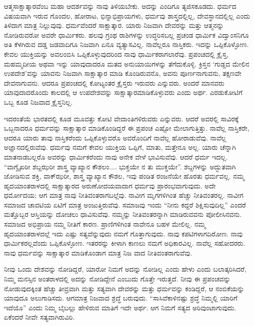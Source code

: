 \vskip 0.2cm 

ಆತ್ಮಸಾಕ್ಷಾತ್ಕಾರವೆಂಬ ಮಹಾ ಆದರ್ಶವನ್ನು ನಾವು ತಿಳಿಯಬೇಕು. ಅದನ್ನು ಎಂದಿಗೂ ತ್ಯಜಿಸಕೂಡದು. ಧರ್ಮದ ವಿಷಯವಾಗಿ ಇರುವ ಗೊಂದಲ, ಹೋರಾಟ, ಭಿನ್ನಾಭಿಪ್ರಾಯಗಳು, ಧರ್ಮವು ಶಾಸ್ತ್ರದಲ್ಲಿಲ್ಲ, ದೇವಸ್ಥಾನದಲ್ಲಿಲ್ಲ ಎಂದು ತಿಳಿದಾಗ ಮಾತ್ರ ನಿಲ್ಲುವುವು. ಧರ್ಮವೆಂದರೆ ಸಾಕ್ಷಾತ್ಕಾರ. ಯಾರು ನಿಜವಾಗಿ ದೇವರನ್ನು ಮತ್ತು ಆತ್ಮನನ್ನು ನೋಡಿರುವರೋ ಅವರೇ ಧಾರ್ಮಿಕರು. ಹಲವು ಗ್ರಂಥ ರಾಶಿಗಳನ್ನು ಉದ್ಧರಿಸಬಲ್ಲ ಪ್ರಚಂಡ ಧಾರ್ಮಿಕ ವಿದ್ವಾಂಸನಿಗೂ ಅತಿ ಕೆಳಗಿರುವ ದಡ್ಡ ಜಡವಾದಿಗೂ ನಿಜವಾಗಿ ಏನೂ ವ್ಯತ್ಯಾಸವಿಲ್ಲ. ನಾವೆಲ್ಲರೂ ನಾಸ್ತಿಕರು. ಇದನ್ನು ಒಪ್ಪಿಕೊಳ್ಳೋಣ. ಕೇವಲ ಯುಕ್ತಿಯನ್ನು ಅವಲಂಬಿಸಿ ಒಪ್ಪಿಕೊಳ್ಳುವುದರಿಂದ ನಾವು ಧಾರ್ಮಿಕರಾಗಲಾರೆವು. ಪ್ರಪಂಚದಲ್ಲಿ ಕ್ರೈಸ್ತ, ಮಹಮ್ಮದೀಯ ಅಥವಾ ಇನ್ನು ಯಾವುದಾದರೂ ಮತದ ಅನುಯಾಯಿಗಳನ್ನು ತೆಗೆದುಕೊಳ್ಳಿ. ಕ್ರಿಸ್ತನ ‘ಗುಡ್ಡದ ಮೇಲಿನ ಉಪದೇಶ’ವನ್ನು ಯಾವನು ನಿಜವಾಗಿ ಸಾಕ್ಷಾತ್ಕಾರ ಮಾಡಿ ಕೊಂಡಿರುವನೊ, ಅವನು ಪೂರ್ಣನಾಗುವನು, ತಕ್ಷಣವೇ ದೇವನಾಗುವನು. ಆದರೂ ಪ್ರಪಂಚದಲ್ಲಿ ಕೋಟ್ಯಂತರ ಕ್ರೈಸ್ತರು ಇರುವರು ಎನ್ನುವರು. ಅಂದರೆ ಮಾನವರು ಯಾವುದಾದರೊಂದು ಕಾಲದಲ್ಲಿ ಆ ಉಪದೇಶವನ್ನು ಸಾಕ್ಷಾತ್ಕಾರಮಾಡಿಕೊಳ್ಳುವರು ಎಂದು ಅರ್ಥ. ಎರಡುಕೋಟಿಗೆ ಒಬ್ಬ ಕೂಡ ನಿಜವಾದ ಕ್ರೈಸ್ತನಿಲ್ಲ.

\vskip 0.2cm 

ಇದರಂತೆಯೆ ಭಾರತದಲ್ಲಿ ಕೂಡ ಮೂವತ್ತು ಕೋಟಿ ವೇದಾಂತಿಗಳಿರುವರು ಎನ್ನುವರು. ಆದರೆ ಅವರಲ್ಲಿ ಸಾವಿರಕ್ಕೆ ಒಬ್ಬನಾದರೂ ಧರ್ಮವನ್ನು ಸಾಕ್ಷಾತ್ಕಾರ ಮಾಡಿಕೊಂಡಿದ್ದರೆ ಈ ಪ್ರಪಂಚ ಎಷ್ಟೋ ಮೇಲಾಗುತ್ತಿತ್ತು. ನಾವೆಲ್ಲ ನಾಸ್ತಿಕರೇ, ಆದರೂ ಯಾರು ತಾವು ನಾಸ್ತಿಕರೆಂದು ಒಪ್ಪಿಕೊಳ್ಳುವರೊ ಅವರೊಂದಿಗೆ ನಾವೆಲ್ಲ ಹೋರಾಡುವೆವು. ನಾವೆಲ್ಲ ಅಜ್ಞಾನದಲ್ಲಿರುವೆವು. ಧರ್ಮವು ನಮಗೆ ಕೇವಲ ಯುಕ್ತಿಯ ಒಪ್ಪಿಗೆ, ಮಾತು, ಮತ್ತೇನೂ ಅಲ್ಲ. ಯಾರು ಚೆನ್ನಾಗಿ ಮಾತನಾಡಬಲ್ಲರೊ ಅವರನ್ನು ಧಾರ್ಮಿಕರೆಂದು ನಾವು ಅನೇಕ ವೇಳೆ ಭಾವಿಸುವೆವು. ಆದರೆ ಧರ್ಮ ಇದಲ್ಲ. “ವಾಗ್ವೈಖರೀ ಶಬ್ದಝರೀ ಶಾಸ್ತ್ರ ವ್ಯಾಖ್ಯಾನ ಕೌಶಲಂ.... ಭುಕ್ತಯೇ ನ ತು ಮುಕ್ತಯೇ”. ಶಬ್ದಗಳನ್ನು ಅದ್ಭುತವಾಗಿ ಜೋಡಿಸುವ ಶಕ್ತಿ, ವಾಕ್​ಝರೀ, ಶಾಸ್ತ್ರ ವ್ಯಾಖ್ಯಾನ ಕೌಶಲ, ಇವು ಪಂಡಿತ ರಂಜನೆಯೇ ಹೊರತು ಧರ್ಮವಲ್ಲ. ನಮ್ಮ ಹೃದಯಾಂತರಾಳದಲ್ಲಿ ಸಾಕ್ಷಾತ್ಕಾರದ ಅರುಣೋದಯವಾದಾಗ ಧರ್ಮವು ಪ್ರಾರಂಭವಾಗುವುದು. ಅದೇ ಧರ್ಮೋದಯ; ಆಗ ಮಾತ್ರ ನಾವು ನೀತಿವಂತರಾಗಬಲ್ಲೆವು. ನಾವೀಗ ಮೃಗಗಳಿಗಿಂತ ಹೆಚ್ಚು ನೀತಿವಂತರಲ್ಲ. ನಾವೀಗ ಸಮಾಜದ ಚಾವಟಿಯ ಏಟಿಗೆ ಮಾತ್ರ ಅಂಜುತ್ತಿರುವೆವು. ಸಮಾಜವು ಇಂದು “ನೀನು ಕದ್ದರೆ ಶಿಕ್ಷಿಸುವುದಿಲ್ಲ” ಎಂದರೆ ಮತ್ತೊಬ್ಬರ ಆಸ್ತಿಯನ್ನು ದೋಚಲು ಧಾವಿಸುವೆವು. ನಮ್ಮನ್ನು ನೀತಿವಂತರನ್ನಾಗಿ ಮಾಡಿರುವವನು ಪೋಲೀಸಿನವನು. ಸಮಾಜದ ಅಭಿಪ್ರಾಯ ನಮ್ಮ ನೀತಿಗೆ ಕಾರಣ. ಪ್ರಾಣಿಗಳಿಗಿಂತ ನಾವೇನೂ ಬಹಳ ಮೇಲಿಲ್ಲ. ನಮ್ಮ ಹೃದಯಾಂತರಾಳದಲ್ಲೆ ಇದು ಎಷ್ಟು ಸತ್ಯವೆನ್ನುವುದು ನಮಗೆ ಗೊತ್ತಾಗುವುದು. ನಾವು ಕಪಟಿಗಳಾಗದಿರೋಣ. ನಾವು ಧಾರ್ಮಿಕರಲ್ಲವೆಂದು ಒಪ್ಪಿಕೊಳ್ಳೋಣ. ಇತರರನ್ನು ಕೀಳಾಗಿ ಕಾಣಲು ನಮಗೆ ಅಧಿಕಾರವಿಲ್ಲ. ನಾವೆಲ್ಲ ಸಹೋದರರು. ನಾವು ಧರ್ಮವನ್ನು ಸಾಕ್ಷಾತ್ಕಾರ ಮಾಡಿಕೊಂಡಾಗ ಮಾತ್ರ ನಿಜ ವಾದ ನೀತಿವಂತರಾಗುವೆವು.

\vskip 0.2cm 

ನೀವು ಒಂದು ದೇಶವನ್ನು ನೋಡಿದ್ದರೆ, ಯಾರೋ ನಿಮಗೆ ಅದನ್ನು ನೋಡಿಲ್ಲ ಎಂದು ಹೇಳು ಎಂದು ಬಲಾತ್ಕರಿಸಿದರೆ, ನಿಮ್ಮ ಮನಸ್ಸಿನ ಅಂತರಾಳದಲ್ಲಿ ಅದನ್ನು ನೋಡಿದ್ದೇನೆ ಎಂಬುದು ಗೊತ್ತೇ ಇರುತ್ತದೆ. ನೀವು ಈ ಪ್ರಪಂಚವನ್ನು ನೋಡುವುದಕ್ಕಿಂತ ಹೆಚ್ಚು ತೀವ್ರವಾಗಿ ಮತ್ತು ಸತ್ಯವಾಗಿ ದೇವರನ್ನು ಮತ್ತು ಧರ್ಮವನ್ನು ಕಂಡಿದ್ದರೆ, ಆ ನಂಬಿಕೆಯನ್ನು ಯಾವುದೂ ಅಲುಗಾಡಿಸದು. ಆಗಮಾತ್ರ ನಿಜವಾದ ಶ್ರದ್ಧೆ ಬರುವುದು. “ಸಾಸಿವೆಕಾಳಿನಷ್ಟು ಶ್ರದ್ಧೆ ನಿಮ್ಮಲ್ಲಿ ಯಾರಿಗೆ ಇದೆಯೊ” ಎಂದು ನಿಮ್ಮ ಬೈಬಲ್ಲು ಹೇಳಿರುವ ಮಾತಿಗೆ ಇದೇ ಅರ್ಥ. ಆಗ ನಿಮಗೆ ಸತ್ಯದ ಅರಿವುಂಟಾಗುವುದು. ಏಕೆಂದರೆ ನೀವೇ ಸತ್ಯವಾಗಿರುವಿರಿ.

